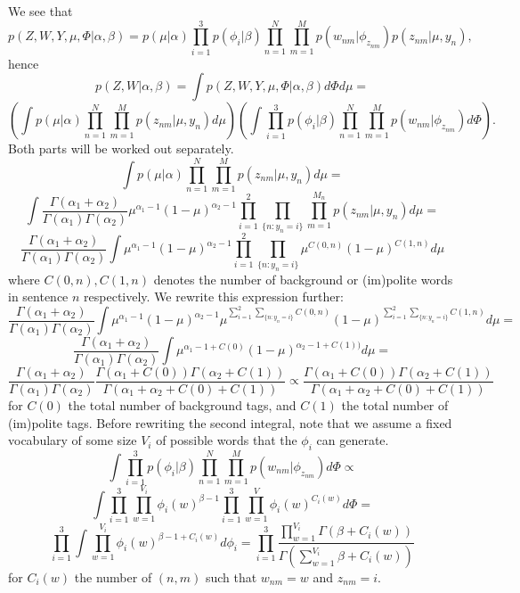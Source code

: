 \documentclass[11pt, english]{article}
\begin{document}
We see that
\[
p(Z,W,Y,\mu,\Phi|\alpha,\beta)=p(\mu |\alpha) \prod_{i=1}^3 p(\phi_i|\beta) \prod_{n=1}^N  \prod_{m=1}^M p(w_{nm}|\phi_{z_{nm}})p(z_{nm}|\mu,y_n),
\]
hence
\[
p(Z,W|\alpha,\beta)=\int p(Z,W,Y,\mu,\Phi|\alpha,\beta) d\Phi d\mu =
\]
\[
\left(\int p(\mu |\alpha)\prod_{n=1}^N  \prod_{m=1}^M p(z_{nm}|\mu,y_n)d\mu \right) \left( \int \prod_{i=1}^3 p(\phi_i|\beta) \prod_{n=1}^N  \prod_{m=1}^M p(w_{nm}|\phi_{z_{nm}}) d\Phi \right).
\]
Both parts will be worked out separately. 
\[
\int p(\mu|\alpha)\prod_{n=1}^N  \prod_{m=1}^M p(z_{nm}|\mu, y_n)d\mu=
\]
\[
\int \frac{\Gamma(\alpha_1+\alpha_2)}{\Gamma(\alpha_1)\Gamma(\alpha_2)} \mu^{\alpha_1-1}(1-\mu)^{\alpha_2-1} \prod_{i=1}^2 \prod_{\{n:y_n=i\}}  \prod_{m=1}^{M_n} p(z_{nm}|\mu,y_n)d\mu=
\]
\[
 \frac{\Gamma(\alpha_1+\alpha_2)}{\Gamma(\alpha_1)\Gamma(\alpha_2)} \int  \mu^{\alpha_1-1}(1-\mu)^{\alpha_2-1} \prod_{i=1}^2 \prod_{\{n:y_n=i\}} \mu^{C(0,n)}(1-\mu)^{C(1,n)}d\mu
\]
where $C(0,n),C(1,n)$ denotes the number of background or (im)polite words in sentence $n$ respectively. We rewrite this expression further:
\[
\frac{\Gamma(\alpha_1+\alpha_2)}{\Gamma(\alpha_1)\Gamma(\alpha_2)}
\int  \mu^{\alpha_1-1}(1-\mu)^{\alpha_2-1} \mu^{ \sum_{i=1}^2  \sum_{\{n:y_n=i\}}C(0,n)}(1-\mu)^{\sum_{i=1}^2  \sum_{\{n:y_n=i\}}C(1,n)}d\mu=
\]
\[
 \frac{\Gamma(\alpha_1+\alpha_2)}{\Gamma(\alpha_1)\Gamma(\alpha_2)}
\int  \mu^{\alpha_1-1+C(0)}(1-\mu)^{\alpha_2-1+C(1))}d\mu=
\]
\[
\frac{\Gamma(\alpha_1+\alpha_2)}{\Gamma(\alpha_1)\Gamma(\alpha_2)} \frac{\Gamma(\alpha_1+C(0))\Gamma(\alpha_2+C(1))}{\Gamma(\alpha_1+\alpha_2+C(0)+C(1))}\propto
\frac{\Gamma(\alpha_1+C(0))\Gamma(\alpha_2+C(1))}{\Gamma(\alpha_1+\alpha_2+C(0)+C(1))}
\]
for $C(0)$ the total number of background tags, and $C(1)$ the total number of (im)polite tags.
Before rewriting the second integral, note that we assume a fixed vocabulary of some size $V_i$ of possible words that the $\phi_i$ can generate.
\[
\int \prod_{i=1}^3 p(\phi_i|\beta) \prod_{n=1}^N  \prod_{m=1}^M p(w_{nm}|\phi_{z_{nm}}) d\Phi \propto
\]
\[
\int \prod_{i=1}^3 \prod_{w=1}^{V_i}\phi_i(w)^{\beta-1} \prod_{i=1}^3 \prod_{w=1}^V \phi_i(w)^{C_i(w)} d\Phi=
\]
\[
 \prod_{i=1}^3 \int \prod_{w=1}^{V_i} \phi_i(w)^{\beta-1+C_i(w)} d\phi_i= \prod_{i=1}^3 \frac{\prod_{w=1}^{V_i}\Gamma(\beta+C_i(w))}{\Gamma(\sum_{w=1}^{V_i}\beta+C_i(w))}
\]
for $C_i(w)$ the number of $(n,m)$ such that $w_{nm}=w$ and $z_{nm}=i$.
\end{document}
